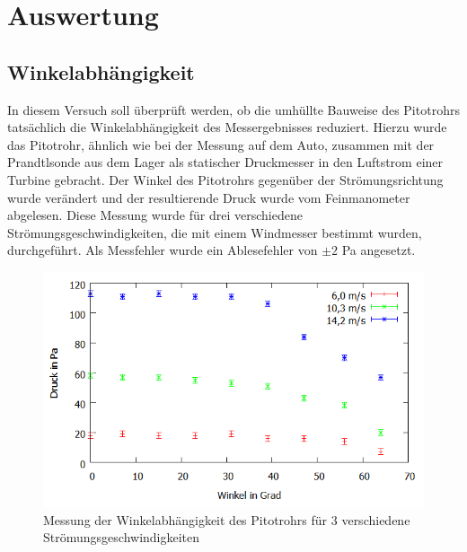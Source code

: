 \section{Auswertung}
\subsection{Winkelabhängigkeit}
In diesem Versuch soll überprüft werden, ob die umhüllte Bauweise des Pitotrohrs tatsächlich die Winkelabhängigkeit des Messergebnisses reduziert.
Hierzu wurde das Pitotrohr, ähnlich wie bei der Messung auf dem Auto, zusammen mit der Prandtlsonde aus dem Lager als statischer Druckmesser in den Luftstrom einer Turbine gebracht. Der Winkel des Pitotrohrs gegenüber der Strömungsrichtung wurde verändert und der resultierende Druck wurde vom Feinmanometer abgelesen. Diese Messung wurde für drei verschiedene Strömungsgeschwindigkeiten, die mit einem Windmesser bestimmt wurden, durchgeführt. Als Messfehler wurde ein Ablesefehler von $\pm2$ Pa angesetzt.
\begin{figure}
        \includegraphics[width=.9\textwidth]{images/Winkel}
\caption{Messung der Winkelabhängigkeit des Pitotrohrs für 3 verschiedene Strömungsgeschwindigkeiten}
\label{fig:Winkel}
\end{figure}

